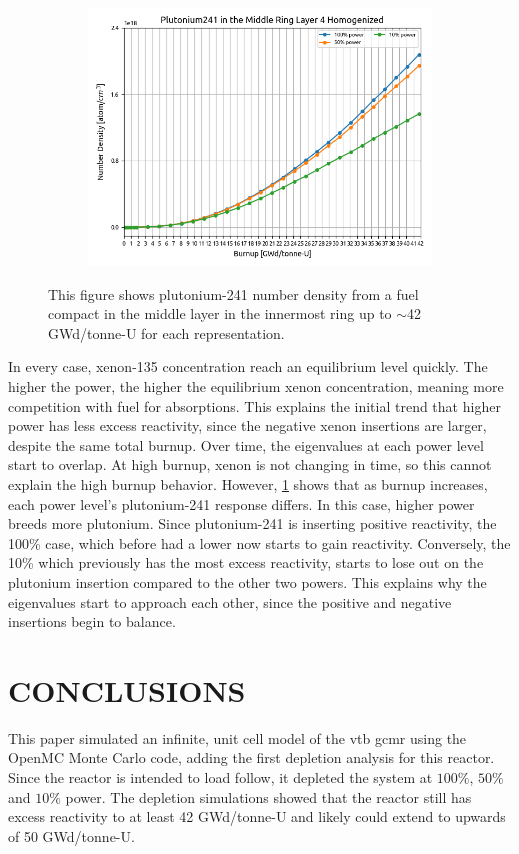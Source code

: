 \documentclass[letterpaper]{physor2024}
\begin{document}
\begin{figure}[!h]
\begin{subfigure}{0.495\linewidth}
        \includegraphics[width=\linewidth]{figures/homogenized_Pu_241.png}
    \end{subfigure}
    \caption{This figure shows plutonium-241 number density from a fuel compact in the middle layer in the innermost ring up to $\sim$42 GWd/tonne-U for each representation.}
    \label{fig:plutoniums}
\end{figure}

In every case, xenon-135 concentration reach an equilibrium level quickly. The higher the power, the higher the equilibrium xenon concentration, meaning more competition with fuel for absorptions. This explains the initial trend that higher power has less excess reactivity, since the negative xenon insertions are larger, despite the same total burnup. Over time, the eigenvalues at each power level start to overlap. At high burnup, xenon is not changing in time, so this cannot explain the high burnup behavior. However, \cref{fig:plutoniums} shows that as burnup increases, each power level's plutonium-241 response differs. In this case, higher power breeds more plutonium. Since plutonium-241 is inserting positive reactivity, the 100\% case, which before had a lower \kinf now starts to gain reactivity. Conversely, the 10\% which previously has the most excess reactivity, starts to lose out on the plutonium insertion compared to the other two powers. This explains why the eigenvalues start to approach each other, since the positive and negative insertions begin to balance.

\section{CONCLUSIONS}\label{sec:conclusions}
This paper simulated an infinite, unit cell model of the \gls{vtb} \gls{gcmr} using the OpenMC Monte Carlo code, adding the first depletion analysis for this reactor. Since the reactor is intended to load follow, it depleted the system at $100\%$, $50\%$ and $10\%$ power. The depletion simulations showed that the reactor still has excess reactivity to at least 42 GWd/tonne-U and likely could extend to upwards of 50 GWd/tonne-U.
\end{document}
